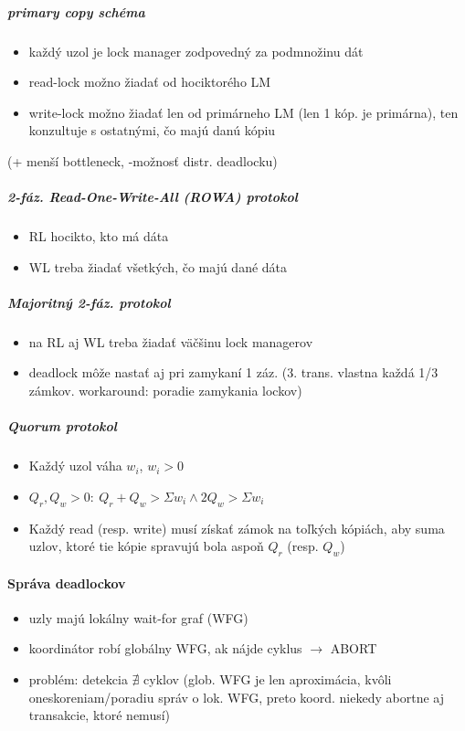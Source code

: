 \documentclass[a4paper]{report}
\begin{document}
\subparagraph*{primary copy schéma}
\begin{itemize}
 \item každý uzol je lock manager zodpovedný za podmnožinu dát
 \item read-lock možno žiadať od hociktorého LM
 \item write-lock možno žiadať len od primárneho LM (len 1 kóp. je primárna), ten konzultuje s ostatnými, čo majú danú kópiu
\end{itemize}

\noindent
(+ menší bottleneck, -možnosť distr. deadlocku)

\subparagraph*{2-fáz. Read-One-Write-All (ROWA) protokol}
\begin{itemize}
 \item RL hocikto, kto má dáta
 \item WL treba žiadať všetkých, čo majú dané dáta
\end{itemize}

\subparagraph*{Majoritný 2-fáz. protokol}
\begin{itemize}
 \item na RL aj WL treba žiadať väčšinu lock managerov
 \item deadlock môže nastať aj pri zamykaní 1 záz. (3. trans. vlastna každá 1/3 zámkov. workaround: poradie zamykania lockov)
\end{itemize}

\subparagraph*{Quorum protokol}
\begin{itemize}
 \item Každý uzol váha $w_i$, $w_i > 0$
 \item $Q_r,Q_w > 0:\:Q_r + Q_w > \Sigma w_i \wedge 2 Q_w > \Sigma w_i$
 \item Každý read (resp. write) musí získať zámok na toľkých kópiách, aby suma uzlov, ktoré tie kópie spravujú bola aspoň $Q_r$ (resp. $Q_w$)
\end{itemize}

\paragraph{Správa deadlockov}
\begin{itemize}
 \item uzly majú lokálny wait-for graf (WFG)
 \item koordinátor robí globálny WFG, ak nájde cyklus $\rightarrow$ ABORT
 \item problém: detekcia $\nexists$ cyklov (glob. WFG je len aproximácia, kvôli oneskoreniam/poradiu správ o lok. WFG, preto koord. niekedy abortne aj transakcie, ktoré nemusí)
\end{itemize}
\end{document}
